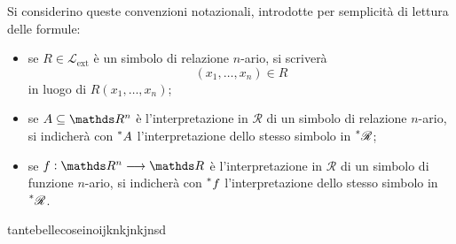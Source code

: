 {    Si considerino queste convenzioni notazionali, introdotte per semplicità di lettura delle formule: \begin{itemize}
        \item se $ R \in \mathcal{L}_{\text{ext}}  $ è un simbolo di relazione $ n $-ario, si scriverà \begin{equation*}
            (x_1,\dots,x_{n} ) \in R
        \end{equation*}in luogo di $ R(x_1,\dots,x_{n} ) $; 
        \item se $ A \subseteq \R^{n} $ è l'interpretazione in $ \mathscr{R} $ di un simbolo di relazione $ n $-ario, si indicherà con $ \prescript{*}{}{A} $ l'interpretazione dello stesso simbolo in $ \prescript{*}{}{\mathscr{R}} $;
        \item se $ f: \R^{n} \longrightarrow \R$ è l'interpretazione in $ \mathscr{R} $ di un simbolo di funzione $ n $-ario, si indicherà con $ \prescript{*}{}{f} $ l'interpretazione dello stesso simbolo in $ \prescript{*}{}{\mathscr{R}} $.
    \end{itemize}


}{tantebellecoseinoijknkjnkjnsd}{}


